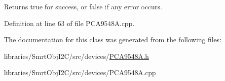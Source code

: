 \begin{DoxyReturn}{Returns}
true for success, or false if any error occurs. 
\end{DoxyReturn}


Definition at line 63 of file P\+C\+A9548\+A.\+cpp.



The documentation for this class was generated from the following files\+:\begin{DoxyCompactItemize}
\item 
libraries/\+Smrt\+Obj\+I2\+C/src/devices/\hyperlink{_p_c_a9548_a_8h}{P\+C\+A9548\+A.\+h}\item 
libraries/\+Smrt\+Obj\+I2\+C/src/devices/P\+C\+A9548\+A.\+cpp\end{DoxyCompactItemize}
